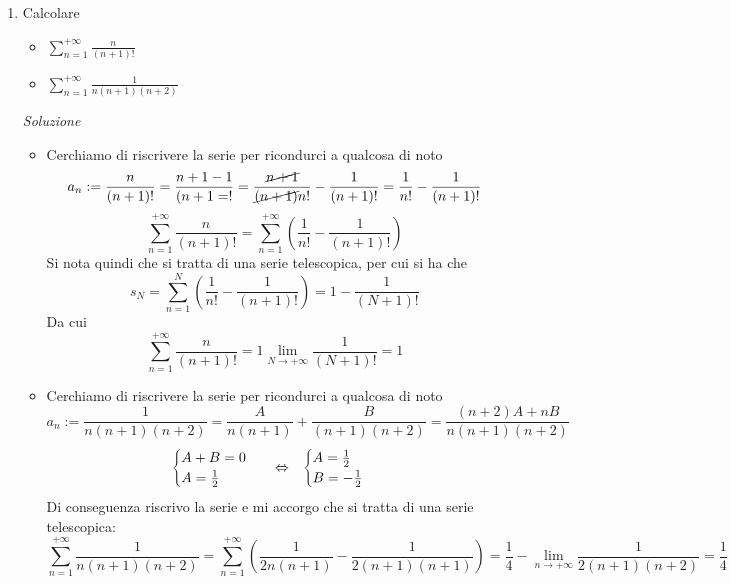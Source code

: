 \documentclass{article}
\begin{document}
\begin{enumerate}[label=\textbf{Esercizio 
    8.\arabic*.},itemindent=*]
\begin{itemize}
    \item divergente se $q\geq1$
    \item indeterminata se $q\leq 1$
\end{itemize}
Si tratta quindi di risolvere 
\(\left|\frac{2+\alpha}{1-\alpha}\right|<1\)
e si ottiene che la serie è
\begin{itemize}
    \item convergente se $\alpha<-\frac{1}{2}$
    \item divergente se $-\frac{1}{2}\leq \alpha\leq 1$
    \item indeterminata se $\alpha> 1$
\end{itemize}
Inoltre se la serie converge
\[\sum_{n=0}^{+\infty}=\frac{1}{1-q}=\frac{1}{1-\frac{2+\alpha}{1-\alpha}}=\frac{\alpha-1}{2\alpha+1}\]

\item Calcolare \begin{itemize}
    \item $\sum_{n=1}^{+\infty}\frac{n}{(n+1)!}$
    \item $\sum_{n=1}^{+\infty}\frac{1}{n(n+1)(n+2)}$
\end{itemize}
\item[\textit{\large Soluzione~}]~
\begin{itemize}
    \item Cerchiamo di riscrivere la serie per ricondurci a qualcosa di noto
    \[a_n:=\frac{n}{(n+1)!}=\frac{n+1-1}{(n+1=!}=\frac{\cancel{n+1}}{\cancel{(n+1)}n!}-\frac{1}{(n+1)!}=\frac{1}{n!}-\frac{1}{(n+1)!}\]
    \[\sum_{n=1}^{+\infty}\frac{n}{(n+1)!}=\sum_{n=1}^{+\infty}\left(\frac{1}{n!}-\frac{1}{(n+1)!}\right)\]
    Si nota quindi che si tratta di una serie telescopica, per cui si ha che
    \[s_N=\sum_{n=1}^{N}\left(\frac{1}{n!}-\frac{1}{(n+1)!}\right)={1}-\frac{1}{(N+1)!}\]
    Da cui 
    \[\sum_{n=1}^{+\infty}\frac{n}{(n+1)!}=1\lim_{N\to+\infty}\frac{1}{(N+1)!}=1\]
    \item Cerchiamo di riscrivere la serie per ricondurci a qualcosa di noto
    \[a_n:=\frac{1}{n(n+1)(n+2)}=\frac{A}{n(n+1)}+\frac{B}{(n+1)(n+2)}=\frac{(n+2)A+nB}{n(n+1)(n+2)}\]
    \[\begin{cases}
        A+B=0\\
        A=\frac{1}{2}
    \end{cases}~~\Leftrightarrow~~\begin{cases}
        A=\frac{1}{2}\\
        B=-\frac{1}{2}
    \end{cases}\]
    Di conseguenza riscrivo la serie e mi accorgo che si tratta di una serie telescopica:
    \[\sum_{n=1}^{+\infty}\frac{1}{n(n+1)(n+2)}=\sum_{n=1}^{+\infty}\left( \frac{1}{2n(n+1)}-\frac{1}{2(n+1)(n+1)} \right)=\frac{1}{4}-\lim_{n\to+\infty}\frac{1}{2(n+1)(n+2)}=\frac{1}{4}\]
    
\end{itemize}

\end{enumerate}
\end{document}
